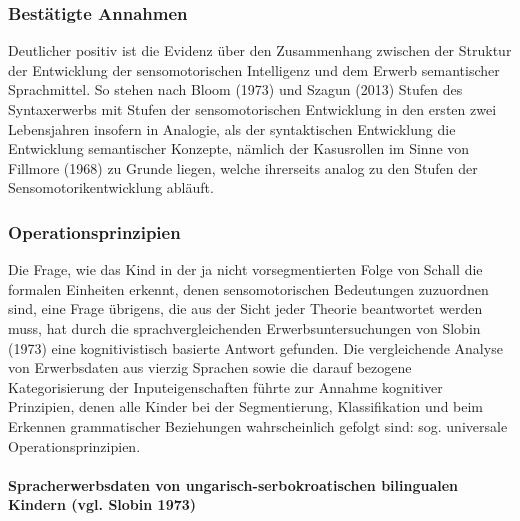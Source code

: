 \documentclass[
  letterpaper,
]{scrbook}
\let\oldparagraph\paragraph
\renewcommand{\paragraph}[1]{\oldparagraph{#1}\mbox{}}
\begin{document}
\hypertarget{bestuxe4tigte-annahmen}{%
\subsubsection{Bestätigte Annahmen}\label{bestuxe4tigte-annahmen}}

Deutlicher positiv ist die Evidenz über den Zusammenhang zwischen der
Struktur der Entwicklung der sensomotorischen Intelligenz und dem Erwerb
semantischer Sprachmittel. So stehen nach Bloom (1973) und Szagun (2013)
Stufen des Syntaxerwerbs mit Stufen der sensomotorischen Entwicklung in
den ersten zwei Lebensjahren insofern in Analogie, als der syntaktischen
Entwicklung die Entwicklung semantischer Konzepte, nämlich der
Kasusrollen im Sinne von Fillmore (1968) zu Grunde liegen, welche
ihrerseits analog zu den Stufen der Sensomotorikentwicklung abläuft.

\hypertarget{operationsprinzipien}{%
\subsubsection{Operationsprinzipien}\label{operationsprinzipien}}

Die Frage, wie das Kind in der ja nicht vorsegmentierten Folge von
Schall die formalen Einheiten erkennt, denen sensomotorischen
Bedeutungen zuzuordnen sind, eine Frage übrigens, die aus der Sicht
jeder Theorie beantwortet werden muss, hat durch die
sprachvergleichenden Erwerbsuntersuchungen von Slobin (1973) eine
kognitivistisch basierte Antwort gefunden. Die vergleichende Analyse von
Erwerbsdaten aus vierzig Sprachen sowie die darauf bezogene
Kategorisierung der Inputeigenschaften führte zur Annahme kognitiver
Prinzipien, denen alle Kinder bei der Segmentierung, Klassifikation und
beim Erkennen grammatischer Beziehungen wahrscheinlich gefolgt sind:
sog. universale Operationsprinzipien.\\

\hypertarget{spracherwerbsdaten-von-ungarisch-serbokroatischen-bilingualen-kindern-vgl.-slobin-1973}{%
\paragraph{Spracherwerbsdaten von ungarisch-serbokroatischen bilingualen
Kindern (vgl. Slobin
1973)}\label{spracherwerbsdaten-von-ungarisch-serbokroatischen-bilingualen-kindern-vgl.-slobin-1973}}
\end{document}
